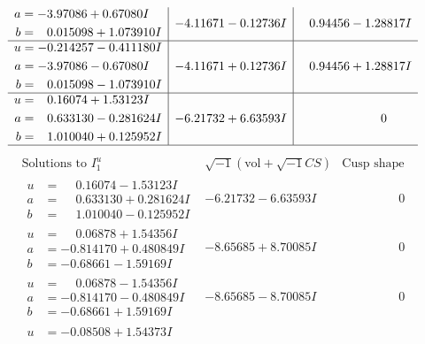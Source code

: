 \documentclass[1p]{elsarticle_modified}
\theoremstyle{definition}
\newcommand{\I}{\sqrt{-1}}
\begin{document}
$$\begin{array}{c|c|c}
\begin{aligned}
a &= -3.97086 + 0.67080 I \\
b &= \phantom{-}0.015098 + 1.073910 I\end{aligned}
 & -4.11671 - 0.12736 I & \phantom{-}0.94456 - 1.28817 I \\ \hline\begin{aligned}
u &= -0.214257 - 0.411180 I \\
a &= -3.97086 - 0.67080 I \\
b &= \phantom{-}0.015098 - 1.073910 I\end{aligned}
 & -4.11671 + 0.12736 I & \phantom{-}0.94456 + 1.28817 I \\ \hline\begin{aligned}
u &= \phantom{-}0.16074 + 1.53123 I \\
a &= \phantom{-}0.633130 - 0.281624 I \\
b &= \phantom{-}1.010040 + 0.125952 I\end{aligned}
 & -6.21732 + 6.63593 I & \phantom{-0.000000 } 0\\
 \hline 
 \end{array}$$\newpage$$\begin{array}{c|c|c}  
\text{Solutions to }I^u_{1}& \I (\text{vol} + \sqrt{-1}CS) & \text{Cusp shape}\\
 \hline 
\begin{aligned}
u &= \phantom{-}0.16074 - 1.53123 I \\
a &= \phantom{-}0.633130 + 0.281624 I \\
b &= \phantom{-}1.010040 - 0.125952 I\end{aligned}
 & -6.21732 - 6.63593 I & \phantom{-0.000000 } 0 \\ \hline\begin{aligned}
u &= \phantom{-}0.06878 + 1.54356 I \\
a &= -0.814170 + 0.480849 I \\
b &= -0.68661 - 1.59169 I\end{aligned}
 & -8.65685 + 8.70085 I & \phantom{-0.000000 } 0 \\ \hline\begin{aligned}
u &= \phantom{-}0.06878 - 1.54356 I \\
a &= -0.814170 - 0.480849 I \\
b &= -0.68661 + 1.59169 I\end{aligned}
 & -8.65685 - 8.70085 I & \phantom{-0.000000 } 0 \\ \hline\begin{aligned}
u &= -0.08508 + 1.54373 I \\

\end{aligned}
\end{array}$$
\end{document}
